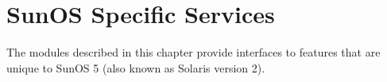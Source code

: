 \chapter{SunOS Specific Services}
\label{sunos}

The modules described in this chapter provide interfaces to features
that are unique to SunOS 5 (also known as Solaris version 2).

\localmoduletable
